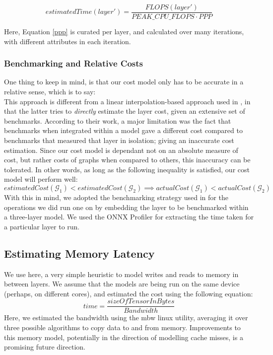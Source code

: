 \documentclass[12pt,a4paper,twoside,openright,bibliography=totocnumbered]{report}
\begin{document}
    \begin{equation}
        estimatedTime(layer')=\frac{FLOPS(layer')}{PEAK\_CPU\_FLOPS \cdot PPP}
        \label{estimatedTime}
    \end{equation}
    
    Here, Equation \ref{ppp} is curated per layer, and calculated over many iterations, with different attributes in each iteration. 

    \subsubsection{Benchmarking and Relative Costs}
    One thing to keep in mind, is that our cost model only has to be accurate in a relative sense, which is to say:\\
    This approach is different from a linear interpolation-based approach used in \cite{osterwind2022hardware}, in that the latter tries to \textit{directly} estimate the layer cost, given an extensive set of benchmarks. According to their work, a major limitation was the fact that benchmarks when integrated within a model gave a different cost compared to benchmarks that measured that layer in isolation; giving an inaccurate cost estimation. Since our cost model is dependant not on an absolute measure of cost, but rather costs of graphs when compared to others, this inaccuracy can be tolerated. In other words, as long as the following inequality is satisfied, our cost model will perform well:
    \begin{equation}
        estimatedCost(\mathcal{G}_1) < estimatedCost(\mathcal{G}_2) \implies actualCost(\mathcal{G}_1) < actualCost(\mathcal{G}_2)
        \label{relativeEstimate}
    \end{equation}
     With this in mind, we adopted the benchmarking strategy used in \cite{osterwind2022hardware} for the operations we did run one on by embedding the layer to be benchmarked within a three-layer model. We used the ONNX Profiler \cite{onnxprofiler} for extracting the time taken for a particular layer to run.
     
    \subsection{Estimating Memory Latency}

    We use here, a very simple heuristic to model writes and reads to memory in between layers. We assume that the models are being run on the same device (perhaps, on different cores), and estimated the cost using the following equation:
    \begin{equation}
        time = \frac{sizeOfTensorInBytes}{Bandwidth}
        \label{memoryCost}
    \end{equation}
    Here, we estimated the bandwidth using the mbw \cite{mbw} linux utility, averaging it over three possible algorithms to copy data to and from memory. Improvements to this memory model, potentially in the direction of modelling cache misses, is a promising future direction.
\end{document}
